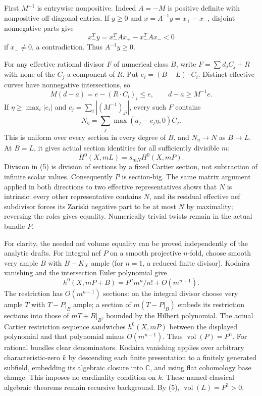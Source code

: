 \documentclass[
  10pt,
]{article}
\begin{document}
First \(M^{-1}\) is entrywise nonpositive. Indeed \(A=-M\) is positive
definite with nonpositive off-diagonal entries. If \(y\ge0\) and
\(x=A^{-1}y=x_+-x_-\), disjoint nonnegative parts give
\[x_-^Ty=x_-^TAx_+-x_-^TAx_-<0\] if \(x_-\ne0\), a contradiction. Thus
\(A^{-1}y\ge0\).

For any effective rational divisor \(F\) of numerical class \(B\), write
\(F=\sum d_jC_j+R\) with none of the \(C_j\) a component of \(R\). Put
\(e_i=(B-L)\cdot C_i\). Distinct effective curves have nonnegative
intersections, so
\[M(d-a)=e-(R\cdot C_i)_i\le e,\qquad d-a\ge M^{-1}e.                  \tag{4}\]
If \(\eta\ge\max_i|e_i|\) and \(c_j=\sum_i|(M^{-1})_{ji}|\), every such
\(F\) contains \[N_\eta=\sum_j\max(a_j-c_j\eta,0)C_j.\] This is uniform
over every section in every degree of \(B\), and \(N_\eta\to N\) as
\(B\to L\). At \(B=L\), it gives actual section identities for all
sufficiently divisible \(m\):
\[H^0(X,mL)=s_{mN}H^0(X,mP).                                        \tag{5}\]
Division in (5) is division of sections by a fixed Cartier section, not
subtraction of infinite scalar values. Consequently \(P\) is
section-big. The same matrix argument applied in both directions to two
effective representatives shows that \(N\) is intrinsic: every other
representative contains \(N\), and its residual effective nef subdivisor
forces its Zariski negative part to be at most \(N\) by maximality;
reversing the roles gives equality. Numerically trivial twists remain in
the actual bundle \(P\).

For clarity, the needed nef volume equality can be proved independently
of the analytic drafts. For integral nef \(P\) on a smooth projective
\(n\)-fold, choose smooth very ample \(B\) with \(B-K_X\) ample (for
\(n=1\), a reduced finite divisor). Kodaira vanishing and the
intersection Euler polynomial give
\[h^0(X,mP+B)=P^n m^n/n!+O(m^{n-1}).\] The restriction has
\(O(m^{n-1})\) sections: on the integral divisor choose very ample \(T\)
with \(T-P|_B\) ample; a section of \(m(T-P|_B)\) embeds its restriction
sections into those of \(mT+B|_B\), bounded by the Hilbert polynomial.
The actual Cartier restriction sequence sandwiches \(h^0(X,mP)\) between
the displayed polynomial and that polynomial minus \(O(m^{n-1})\). Thus
\(\operatorname{vol}(P)=P^n\). For rational bundles clear denominators.
Kodaira vanishing applies over arbitrary characteristic-zero \(k\) by
descending each finite presentation to a finitely generated subfield,
embedding its algebraic closure into \(\mathbb C\), and using flat
cohomology base change. This imposes no cardinality condition on \(k\).
These named classical algebraic theorems remain recursive background. By
(5), \(\operatorname{vol}(L)=P^2>0\).
\end{document}
